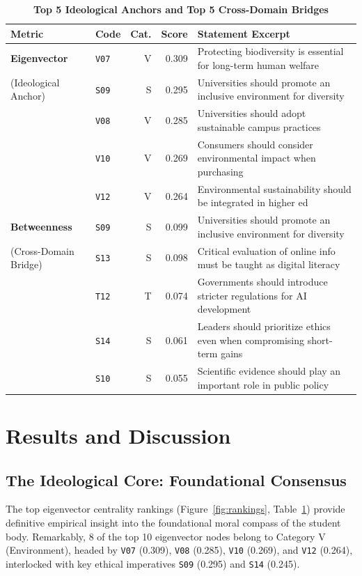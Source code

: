 \documentclass[11pt,a4paper]{article}
\begin{document}
\begin{table}[htbp]
\centering
\small
\caption{\textbf{Top 5 Ideological Anchors and Top 5 Cross-Domain Bridges}}
\label{tab:centrality}
\begin{tabular}{llrrl}
\toprule
\textbf{Metric} & \textbf{Code} & \textbf{Cat.} & \textbf{Score} & \textbf{Statement Excerpt} \\
\midrule
\textbf{Eigenvector} & \texttt{V07} & V & 0.309 & Protecting biodiversity is essential for long-term human welfare \\
(Ideological Anchor) & \texttt{S09} & S & 0.295 & Universities should promote an inclusive environment for diversity \\
                     & \texttt{V08} & V & 0.285 & Universities should adopt sustainable campus practices \\
                     & \texttt{V10} & V & 0.269 & Consumers should consider environmental impact when purchasing \\
                     & \texttt{V12} & V & 0.264 & Environmental sustainability should be integrated in higher ed \\
\midrule
\textbf{Betweenness} & \texttt{S09} & S & 0.099 & Universities should promote an inclusive environment for diversity \\
(Cross-Domain Bridge)& \texttt{S13} & S & 0.098 & Critical evaluation of online info must be taught as digital literacy \\
                     & \texttt{T12} & T & 0.074 & Governments should introduce stricter regulations for AI development \\
                     & \texttt{S14} & S & 0.061 & Leaders should prioritize ethics even when compromising short-term gains \\
                     & \texttt{S10} & S & 0.055 & Scientific evidence should play an important role in public policy \\
\bottomrule
\end{tabular}
\end{table}

\section{Results and Discussion}

\subsection{The Ideological Core: Foundational Consensus}
The top eigenvector centrality rankings (Figure~\ref{fig:rankings}, Table~\ref{tab:centrality}) provide definitive empirical insight into the foundational moral compass of the student body. Remarkably, 8 of the top 10 eigenvector nodes belong to Category V (Environment), headed by \texttt{V07} (0.309), \texttt{V08} (0.285), \texttt{V10} (0.269), and \texttt{V12} (0.264), interlocked with key ethical imperatives \texttt{S09} (0.295) and \texttt{S14} (0.245). 
\end{document}
